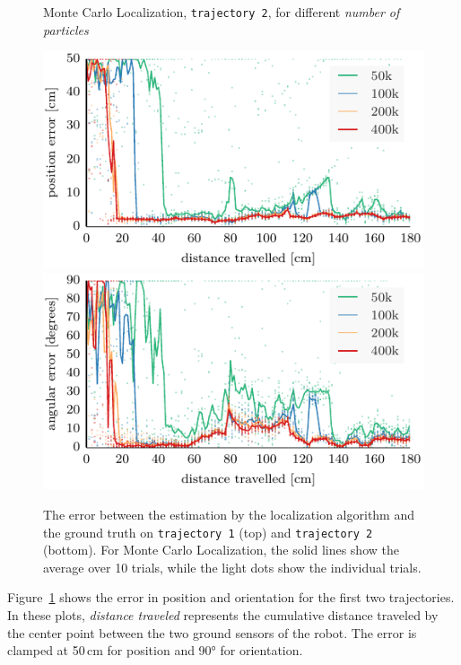 \documentclass[letterpaper, 10pt, conference]{ieeeconf}
\newcommand{\Fig}[1]{Figure~\ref{fig:#1}}
\begin{document}
\begin{figure}
\begin{center}
Monte Carlo Localization, \texttt{trajectory~2}, for different \emph{number of particles}
\end{center}
\includegraphics{mcl-whole_random_2-xy}\hfill
\includegraphics{mcl-whole_random_2-theta}

\caption{The error between the estimation by the localization algorithm and the ground truth on \texttt{trajectory~1} (top) and \texttt{trajectory~2} (bottom).
For Monte Carlo Localization, the solid lines show the average over 10 trials, while the light dots show the individual trials.}
\label{fig:whole-runs-random12}
\end{figure}

\Fig{whole-runs-random12} shows the error in position and orientation for the first two trajectories.
In these plots, \emph{distance traveled} represents the cumulative distance traveled by the center point between the two ground sensors of the robot.
The error is clamped at 50\,cm for position and 90° for orientation.
\end{document}
